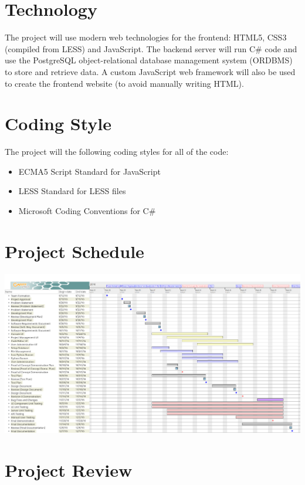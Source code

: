 \documentclass{article}
\begin{document}
\section{Technology}
The project will use modern web technologies for the frontend: HTML5, CSS3
(compiled from LESS) and JavaScript. The backend server will run C\# code and
use the PostgreSQL object-relational database management system (ORDBMS) to
store and retrieve data. A custom JavaScript web framework will also be used to
create the frontend website (to avoid manually writing HTML).

\section{Coding Style}
The project will the following coding styles for all of the code:
\begin{itemize}
  \item ECMA5 Script Standard for JavaScript
  \item LESS Standard for LESS files
  \item Microsoft Coding Conventions for C\#
\end{itemize}

\section{Project Schedule}

\includegraphics[width=\textwidth]{schedule}

\section{Project Review}
\end{document}
